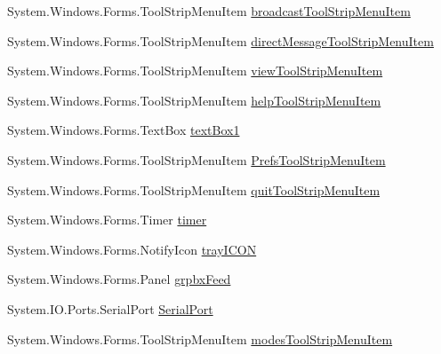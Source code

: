 \begin{DoxyCompactItemize}
\item 
\-System.\-Windows.\-Forms.\-Tool\-Strip\-Menu\-Item \hyperlink{class_sr_p___classroom_inq_1_1frm_classrrom_inq_ac34894d134f025ca6e53b41c744bcf8e}{broadcast\-Tool\-Strip\-Menu\-Item}
\item 
\-System.\-Windows.\-Forms.\-Tool\-Strip\-Menu\-Item \hyperlink{class_sr_p___classroom_inq_1_1frm_classrrom_inq_a8df7e0c2f5ac4cb1494004d85940a786}{direct\-Message\-Tool\-Strip\-Menu\-Item}
\item 
\-System.\-Windows.\-Forms.\-Tool\-Strip\-Menu\-Item \hyperlink{class_sr_p___classroom_inq_1_1frm_classrrom_inq_a703cf9f48d3d8aa2b88e8d9490600c54}{view\-Tool\-Strip\-Menu\-Item}
\item 
\-System.\-Windows.\-Forms.\-Tool\-Strip\-Menu\-Item \hyperlink{class_sr_p___classroom_inq_1_1frm_classrrom_inq_a2cf34a0cb0b52c60e6faea821b2ce0a9}{help\-Tool\-Strip\-Menu\-Item}
\item 
\-System.\-Windows.\-Forms.\-Text\-Box \hyperlink{class_sr_p___classroom_inq_1_1frm_classrrom_inq_a3ee11679c61cc3228121b7fe4f51d0c8}{text\-Box1}
\item 
\-System.\-Windows.\-Forms.\-Tool\-Strip\-Menu\-Item \hyperlink{class_sr_p___classroom_inq_1_1frm_classrrom_inq_ab36e4efbf8b003fc5007cc6522901c21}{\-Prefs\-Tool\-Strip\-Menu\-Item}
\item 
\-System.\-Windows.\-Forms.\-Tool\-Strip\-Menu\-Item \hyperlink{class_sr_p___classroom_inq_1_1frm_classrrom_inq_a7e4ada35eda1d7984167b62ab487ace7}{quit\-Tool\-Strip\-Menu\-Item}
\item 
\-System.\-Windows.\-Forms.\-Timer \hyperlink{class_sr_p___classroom_inq_1_1frm_classrrom_inq_ac5fec0fdbc135ddcefc976786801ee05}{timer}
\item 
\-System.\-Windows.\-Forms.\-Notify\-Icon \hyperlink{class_sr_p___classroom_inq_1_1frm_classrrom_inq_a8c062d5fe665631b364688c76e36e7f7}{tray\-I\-C\-O\-N}
\item 
\-System.\-Windows.\-Forms.\-Panel \hyperlink{class_sr_p___classroom_inq_1_1frm_classrrom_inq_aef19294d5a98aeb9030537fe32d25fde}{grpbx\-Feed}
\item 
\-System.\-I\-O.\-Ports.\-Serial\-Port \hyperlink{class_sr_p___classroom_inq_1_1frm_classrrom_inq_ae7bb088b1faefea06978daccf238ecd0}{\-Serial\-Port}
\item 
\-System.\-Windows.\-Forms.\-Tool\-Strip\-Menu\-Item \hyperlink{class_sr_p___classroom_inq_1_1frm_classrrom_inq_a8eef2c0ef527338feb8e51e6ddef9cc1}{modes\-Tool\-Strip\-Menu\-Item}
\item 

\end{DoxyCompactItemize}
